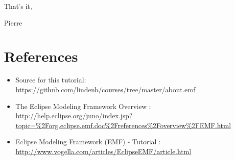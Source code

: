 \documentclass{article}
\begin{document}
That's it,

Pierre

\section{References}
\begin{itemize}
\item Source for this tutorial: \url{https://github.com/lindenb/courses/tree/master/about.emf}
\item The Eclipse Modeling Framework Overview : \url{http://help.eclipse.org/juno/index.jsp?topic=%2Forg.eclipse.emf.doc%2Freferences%2Foverview%2FEMF.html}
\item Eclipse Modeling Framework (EMF) - Tutorial : \url{http://www.vogella.com/articles/EclipseEMF/article.html}
\end{itemize}
\end{document}
